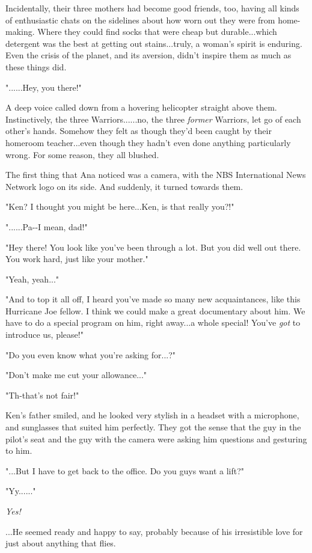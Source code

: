 \documentclass[
]{article}
\begin{document}
Incidentally, their three mothers had become good friends, too, having
all kinds of enthusiastic chats on the sidelines about how worn out they
were from home-making. Where they could find socks that were cheap but
durable...which detergent was the best at getting out stains...truly, a
woman's spirit is enduring. Even the crisis of the planet, and its
aversion, didn't inspire them as much as these things did.

"......Hey, you there!"

A deep voice called down from a hovering helicopter straight above them.
Instinctively, the three Warriors......no, the three \emph{former}
Warriors, let go of each other's hands. Somehow they felt as though
they'd been caught by their homeroom teacher...even though they hadn't
even done anything particularly wrong. For some reason, they all
blushed.

The first thing that Ana noticed was a camera, with the NBS
International News Network logo on its side. And suddenly, it turned
towards them.

"Ken? I thought you might be here...Ken, is that really you?!"

"......Pa-\/-I mean, dad!"

"Hey there! You look like you've been through a lot. But you did well
out there. You work hard, just like your mother."

"Yeah, yeah..."

"And to top it all off, I heard you've made so many new acquaintances,
like this Hurricane Joe fellow. I think we could make a great
documentary about him. We have to do a special program on him, right
away...a whole special! You've \emph{got} to introduce us, please!"

"Do you even know what you're asking for...?"

"Don't make me cut your allowance..."

"Th-that's not fair!"

Ken's father smiled, and he looked very stylish in a headset with a
microphone, and sunglasses that suited him perfectly. They got the sense
that the guy in the pilot's seat and the guy with the camera were asking
him questions and gesturing to him.

"...But I have to get back to the office. Do you guys want a lift?"

"Yy......"

\emph{Yes!}

...He seemed ready and happy to say, probably because of his
irresistible love for just about anything that flies.
\end{document}
